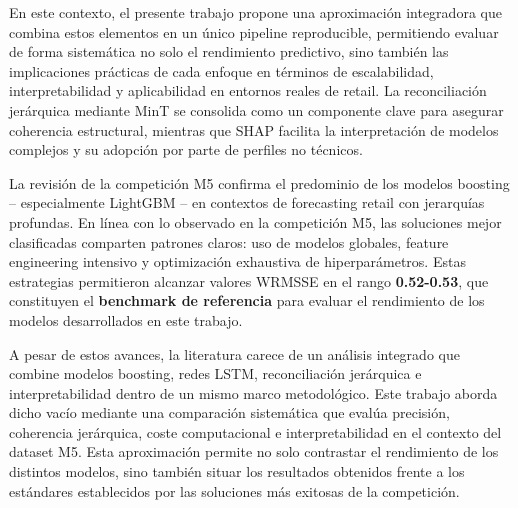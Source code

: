 \documentclass[IB,BIB]{TFUOC}%
\begin{document}
En este contexto, el presente trabajo propone una aproximación integradora que combina estos elementos en un único pipeline reproducible, permitiendo evaluar de forma sistemática no solo el rendimiento predictivo, sino también las implicaciones prácticas de cada enfoque en términos de escalabilidad, interpretabilidad y aplicabilidad en entornos reales de retail.
La reconciliación jerárquica mediante MinT se
consolida como un componente clave para asegurar coherencia estructural,
mientras que SHAP facilita la interpretación de modelos complejos y su
adopción por parte de perfiles no técnicos.

La revisión de la competición M5 confirma el predominio de los modelos
boosting -- especialmente LightGBM -- en contextos de forecasting retail
con jerarquías profundas. En línea con lo observado en la competición
M5, las soluciones mejor clasificadas comparten patrones claros: uso de
modelos globales, feature engineering intensivo y optimización
exhaustiva de hiperparámetros. Estas estrategias permitieron alcanzar
valores WRMSSE en el rango \textbf{0.52-0.53}, que constituyen el
\textbf{benchmark de referencia} para evaluar el rendimiento de los
modelos desarrollados en este trabajo.

A pesar de estos avances, la literatura carece de un análisis integrado
que combine modelos boosting, redes LSTM, reconciliación jerárquica e
interpretabilidad dentro de un mismo marco metodológico. Este trabajo
aborda dicho vacío mediante una comparación sistemática que evalúa
precisión, coherencia jerárquica, coste computacional e
interpretabilidad en el contexto del dataset M5. Esta aproximación
permite no solo contrastar el rendimiento de los distintos modelos, sino
también situar los resultados obtenidos frente a los estándares
establecidos por las soluciones más exitosas de la competición.

\cleardoublepage
\pagestyle{plain}



\end{document}
